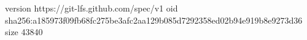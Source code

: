 version https://git-lfs.github.com/spec/v1
oid sha256:a185973f09fb68fc275be3afc2aa129b085d7292358ed02b94e919b8e9273d36
size 43840
